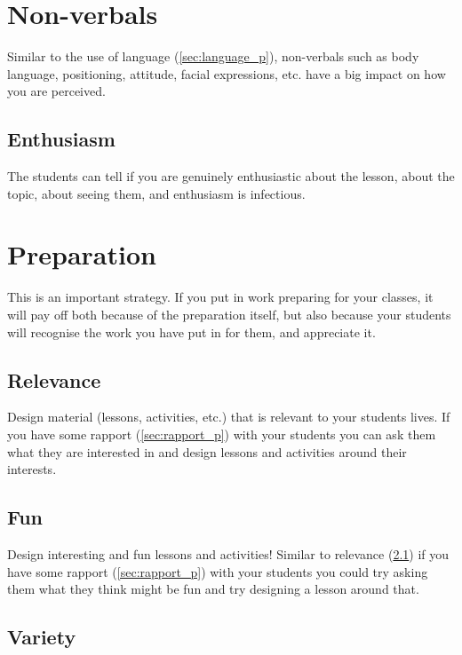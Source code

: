 \documentclass[12pt]{report}
\begin{document}
\section{Non-verbals}
\label{sec:non_verbals_p}

Similar to the use of language (\ref{sec:language_p}), non-verbals such as body language, positioning, attitude, facial expressions, etc. have a big impact on how you are perceived. 

\subsection{Enthusiasm}
\label{sec:enthusiasm_p}

The students can tell if you are genuinely enthusiastic about the lesson, about the topic, about seeing them, and enthusiasm is infectious.



\section{Preparation}
\label{sec:preparation_p}

This is an important strategy. If you put in work preparing for your classes, it will pay off both because of the preparation itself, but also because your students will recognise the work you have put in for them, and appreciate it. 

\subsection{Relevance}
\label{sec:relevance_p}

Design material (lessons, activities, etc.) that is relevant to your students lives. If you have some rapport (\ref{sec:rapport_p}) with your students you can ask them what they are interested in and design lessons and activities around their interests.

\subsection{Fun}
\label{sec:fun_p}

Design interesting and fun lessons and activities! Similar to relevance (\ref{sec:relevance_p}) if you have some rapport (\ref{sec:rapport_p}) with your students you could try asking them what they think might be fun and try designing a lesson around that.

\subsection{Variety}
\label{sec:variety_p}
\end{document}
